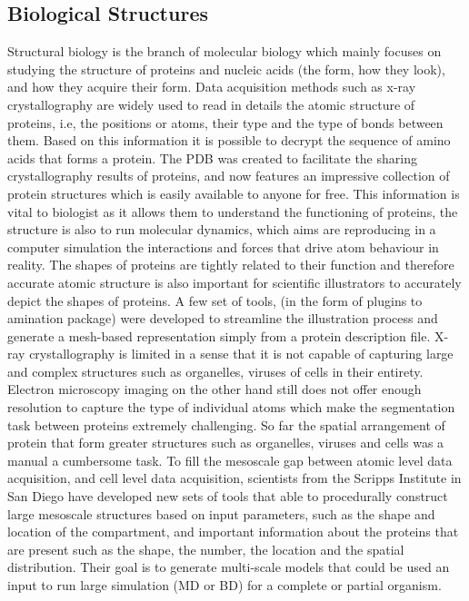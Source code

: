 \subsection{Biological Structures}

Structural biology is the branch of molecular biology which mainly focuses on studying the structure of proteins and nucleic acids (the form, how they look), and how they acquire their form.
Data acquisition methods such as x-ray crystallography are widely used to read in details the atomic structure of proteins, i.e, the positions or atoms, their type and the type of bonds between them.
Based on this information it is possible to decrypt the sequence of amino acids that forms a protein.
The PDB was created to facilitate the sharing crystallography results of proteins, and now features an impressive collection of protein structures which is easily available to anyone for free.
This information is vital to biologist as it allows them to understand the functioning of proteins, the structure is also to run molecular dynamics, which aims are reproducing in a computer simulation the interactions and forces that drive atom behaviour in reality.
The shapes of proteins are tightly related to their function and therefore accurate atomic structure is also important for scientific illustrators to accurately depict the shapes of proteins.
A few set of tools, (in the form of plugins to amination package) were developed to streamline the illustration process and generate a mesh-based representation simply from a protein description file.
X-ray crystallography is limited in a sense that it is not capable of capturing large and complex structures such as organelles, viruses of cells in their entirety.
Electron microscopy imaging on the other hand still does not offer enough resolution to capture the type of individual atoms which make the segmentation task between proteins extremely challenging.
So far the spatial arrangement of protein that form greater structures such as organelles, viruses and cells was a manual a cumbersome task. 
To fill the mesoscale gap between atomic level data acquisition, and cell level data acquisition, scientists from the Scripps Institute in San Diego have developed new sets of tools that able to procedurally construct large mesoscale structures based on input parameters, such as the shape and location of the compartment, and important information about the proteins that are present such as the shape, the number, the location and the spatial distribution.
Their goal is to generate multi-scale models that could be used an input to run large simulation (MD or BD) for a complete or partial organism.
